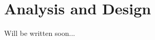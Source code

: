 \chapter[Analysis and Design]{Analysis and Design}
\label{chap:analysis_and_design}


Will be written soon...